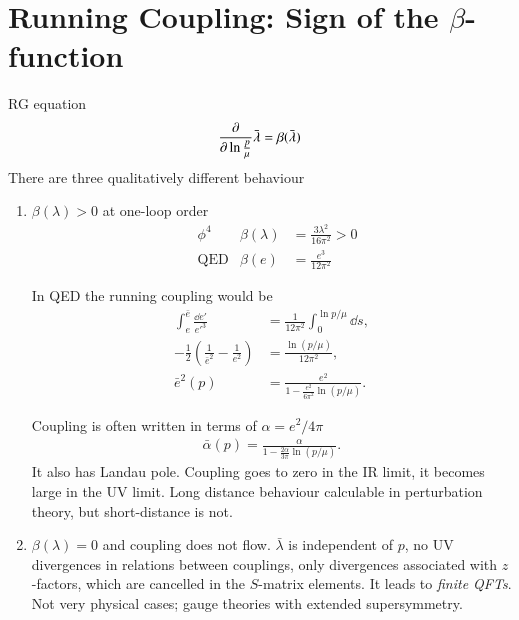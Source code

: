 \section{Running Coupling: Sign of the $\beta$-function}
RG equation 
\begin{align*}
   \pdv{\ln \frac{p}{\mu}} \bar{\lambda} = \beta(\bar{\lambda})
\end{align*}
There are three qualitatively different behaviour
\begin{enumerate}
\item $\beta(\lambda) > 0 $ at one-loop order
\begin{align}
 &\phi^4 &  \beta(\lambda) &= \frac{3\lambda^2}{16\pi^2} > 0  \\
 &\text{QED} & \beta(e) &= \frac{e^3}{12\pi^2} 
\end{align}

In QED the running coupling would be
\begin{align*}
   \int_e^{\bar{e}} \frac{\dd{e'}}{e'^3} &= \frac{1}{12\pi^2} \int_0^{\ln p/\mu} \dd{s}, \\
   - \frac{1}{2} \left( \frac{1}{\bar{e}^2} - \frac{1}{e^2} \right) &= \frac{\ln(p/\mu)}{12\pi^2}, \\
   \bar{e}^2(p) &= \frac{e^2}{1 - \frac{e^2}{6\pi^2} \ln(p/\mu)}.
\end{align*}

Coupling is often written in terms of $\alpha = e^2/4\pi$
\begin{align}
   \bar{\alpha}(p) = \frac{\alpha}{1 - \frac{2\alpha}{3\pi} \ln(p / \mu)}.
\end{align}
It also has Landau pole. Coupling goes to zero in the IR limit, it becomes large in the UV limit. Long distance behaviour calculable in perturbation theory, but short-distance is not.

\item $\beta(\lambda) = 0 $ and 
coupling does not flow. $\bar{\lambda}$ is independent of $p$, no UV divergences in relations between couplings, only divergences associated with $z$-factors, which are cancelled in the $S$-matrix elements. It leads to \textit{finite QFTs}.  Not very physical cases; gauge theories with extended supersymmetry.


\end{enumerate}
